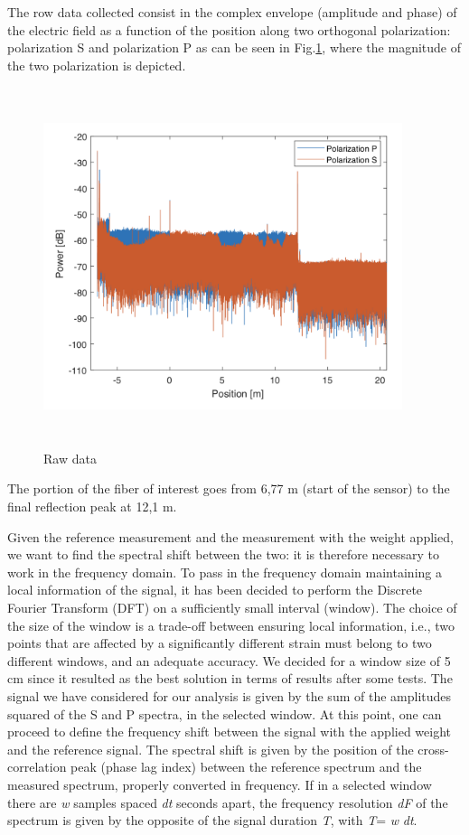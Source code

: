 The row data collected consist in the complex envelope (amplitude and phase) of the electric field as a function of the position along two orthogonal polarization: polarization S and polarization P as can be seen in Fig.\ref{fig:raw}, where the magnitude of the two polarization is depicted.
\begin{figure}[H]
	\centering
	\includegraphics[height=10.5cm, width=10.5cm, keepaspectratio]{img/raw.png}
	\caption{Raw data}\label{fig:raw}
\end{figure}
The portion of the fiber of interest goes from 6,77 m (start of the sensor) to the final reflection peak at 12,1 m.


Given the reference measurement and the measurement with the weight applied, we want to find the spectral shift between the two: it is therefore necessary to work in the frequency domain.
To pass in the frequency domain maintaining a local information of the signal, it has been decided to perform the Discrete Fourier Transform (DFT) on a sufficiently small interval (window). The choice of the size of the window is a trade-off between ensuring local information, i.e., two points that are affected by a significantly different strain must belong to two different windows, and an adequate accuracy. We decided for a window size of 5 cm since it resulted as the best solution in terms of results after some tests.
The signal we have considered for our analysis is given by the sum of the amplitudes squared of the S and P spectra, in the selected window.
At this point, one can proceed to define the frequency shift between the signal with the applied weight and the reference signal. The spectral shift is given by the position of the cross-correlation peak (phase lag index) between the reference spectrum and the measured spectrum, properly converted in frequency.
If in a selected window there are \textit{w} samples spaced \textit{dt} seconds apart, the frequency resolution \textit{dF} of the spectrum is given by the opposite of the signal duration \textit{T}, with \textit{T}= \textit{w} \textit{dt}.

